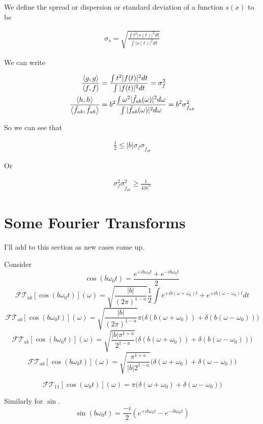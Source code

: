 \documentclass[12pt]{article}
\begin{document}
We define the spread or dispersion or standard deviation of a function $s(x)$ to be

\begin{align}
\sigma_s = \sqrt{\frac{\int t^2|s(t)|^2 dt}{\int|s(t)|^2 dt}}
\end{align}

We can write

\begin{align}
\frac{\Braket{g,g}}{\Braket{f,f}} &= \frac{\int t^2 |f(t)|^2 dt}{\int |f(t)|^2 dt} = \sigma_f^2\\
\frac{\Braket{h,h}}{\Braket{\tilde{f}_{ab},\tilde{f}_{ab}}} &= b^2 \frac{\int \omega^2 |\tilde{f}_{ab}(\omega)|^2 d\omega}{\int |\tilde{f}_{ab}(\omega)|^2 d\omega} = b^2 \sigma_{\tilde{f}_{ab}}^2
\end{align}

So we can see that

\begin{align}
\frac{1}{2} \le |b| \sigma_f \sigma_{\tilde{f}_{ab}}
\end{align}

Or

\begin{align}
\sigma_f^2 \sigma_{\tilde{f}_{ab}}^2 \ge \frac{1}{4 |b|^2}
\end{align}

\section{Some Fourier Transforms}
I'll add to this section as new cases come up.

Consider
\[\cos(b\omega_0 t) = \frac{e^{+i b\omega_0 t}+e^{-i b\omega_0 t}}{2} \]
\[ \mathcal{FT}_{ab}[\cos(b\omega_0 t)](\omega) = \sqrt{\frac{|b|}{(2\pi)^{1-a}}}\frac{1}{2}\int e^{+ib(\omega+\omega_0) t} + e^{+ib(\omega-\omega_0)t} dt  \]
\[  \mathcal{FT}_{ab}[\cos(b\omega_0 t)](\omega) = \sqrt{\frac{|b|}{(2\pi)^{1-a}}} \pi \big(\delta(b(\omega+\omega_0)) + \delta(b(\omega-\omega_0))\big)\]
\[  \mathcal{FT}_{ab}[\cos(b\omega_0 t)](\omega) = \sqrt{\frac{|b| \pi^{1+a}}{2^{1-a}}}\big(\delta(b(\omega+\omega_0)) + \delta(b(\omega-\omega_0))\big)
\]
\[  \mathcal{FT}_{ab}[\cos(b\omega_0 t)](\omega) = \sqrt{\frac{\pi^{1+a}}{|b|2^{1-a}}}\big(\delta(\omega+\omega_0) + \delta(\omega-\omega_0)\big)
\]


\[\mathcal{FT}_{11}[\cos(\omega_0 t)](\omega) = \pi \big(\delta(\omega+\omega_0) + \delta(\omega-\omega_0)\big)
\]


Similarly for $\sin$.
\[
\sin(b\omega_0 t) = \frac{-i}{2} (e^{+ib\omega_0 t} - e^{-ib\omega_0 t})\]
\end{document}
